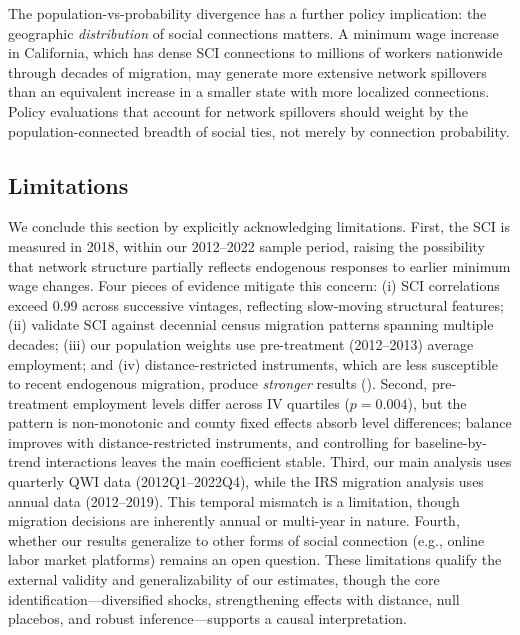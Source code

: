 \documentclass[12pt]{article}
\begin{document}
The population-vs-probability divergence has a further policy implication: the geographic \textit{distribution} of social connections matters. A minimum wage increase in California, which has dense SCI connections to millions of workers nationwide through decades of migration, may generate more extensive network spillovers than an equivalent increase in a smaller state with more localized connections. Policy evaluations that account for network spillovers should weight by the population-connected breadth of social ties, not merely by connection probability.

\subsection{Limitations}

We conclude this section by explicitly acknowledging limitations. First, the SCI is measured in 2018, within our 2012--2022 sample period, raising the possibility that network structure partially reflects endogenous responses to earlier minimum wage changes. Four pieces of evidence mitigate this concern: (i) SCI correlations exceed 0.99 across successive vintages, reflecting slow-moving structural features; (ii) \citet{bailey2020social} validate SCI against decennial census migration patterns spanning multiple decades; (iii) our population weights use pre-treatment (2012--2013) average employment; and (iv) distance-restricted instruments, which are less susceptible to recent endogenous migration, produce \textit{stronger} results (). Second, pre-treatment employment levels differ across IV quartiles ($p = 0.004$), but the pattern is non-monotonic and county fixed effects absorb level differences; balance improves with distance-restricted instruments, and controlling for baseline-by-trend interactions leaves the main coefficient stable. Third, our main analysis uses quarterly QWI data (2012Q1--2022Q4), while the IRS migration analysis uses annual data (2012--2019). This temporal mismatch is a limitation, though migration decisions are inherently annual or multi-year in nature. Fourth, whether our results generalize to other forms of social connection (e.g., online labor market platforms) remains an open question. These limitations qualify the external validity and generalizability of our estimates, though the core identification---diversified shocks, strengthening effects with distance, null placebos, and robust inference---supports a causal interpretation.


\end{document}
